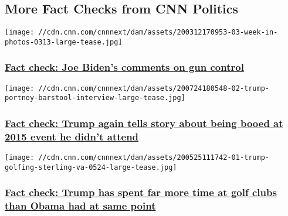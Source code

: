\hypertarget{more-fact-checks-from-cnn-politics-}{%
\subsection{More Fact Checks from CNN
Politics~}\label{more-fact-checks-from-cnn-politics-}}

\href{/2020/03/21/politics/fact-check-joe-biden-gun-control/index.html}{}

\texttt{[image: //cdn.cnn.com/cnnnext/dam/assets/200312170953-03-week-in-photos-0313-large-tease.jpg]}

\hypertarget{fact-check-joe-bidens-comments-on-gun-control}{%
\subsubsection{\texorpdfstring{\href{/2020/03/21/politics/fact-check-joe-biden-gun-control/index.html}{Fact
check: Joe Biden's comments on gun
control}}{Fact check: Joe Biden's comments on gun control}}\label{fact-check-joe-bidens-comments-on-gun-control}}

\href{/2020/07/24/politics/trump-barstool-interview-robin-hood-booed/index.html}{}

\texttt{[image: //cdn.cnn.com/cnnnext/dam/assets/200724180548-02-trump-portnoy-barstool-interview-large-tease.jpg]}

\hypertarget{fact-check-trump-again-tells-story-about-being-booed-at-2015-event-he-didnt-attend-}{%
\subsubsection{\texorpdfstring{\href{/2020/07/24/politics/trump-barstool-interview-robin-hood-booed/index.html}{Fact
check: Trump again tells story about being booed at 2015 event he didn't
attend
}}{Fact check: Trump again tells story about being booed at 2015 event he didn't attend }}\label{fact-check-trump-again-tells-story-about-being-booed-at-2015-event-he-didnt-attend-}}

\href{/2020/05/25/politics/fact-check-trump-obama-golf/index.html}{}

\texttt{[image: //cdn.cnn.com/cnnnext/dam/assets/200525111742-01-trump-golfing-sterling-va-0524-large-tease.jpg]}

\hypertarget{fact-check-trump-has-spent-far-more-time-at-golf-clubs-than-obama-had-at-same-point}{%
\subsubsection{\texorpdfstring{\href{/2020/05/25/politics/fact-check-trump-obama-golf/index.html}{Fact
check: Trump has spent far more time at golf clubs than Obama had at
same
point}}{Fact check: Trump has spent far more time at golf clubs than Obama had at same point}}\label{fact-check-trump-has-spent-far-more-time-at-golf-clubs-than-obama-had-at-same-point}}

